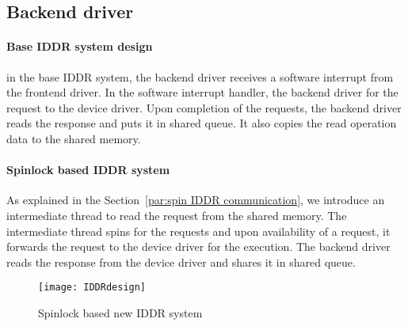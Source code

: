 \subsection{Backend driver}
\paragraph{Base IDDR system design}
in the base IDDR system, the backend driver receives a software interrupt from the frontend driver. In the software interrupt handler, the backend driver for the request to the device driver. Upon completion of the requests, the backend driver reads the response and puts it in shared queue. It also copies the read operation data to the shared memory. 

\paragraph{Spinlock based IDDR system}
As explained in the Section~\ref{par:spin IDDR communication}, we introduce an intermediate thread to read the request from the shared memory. The intermediate thread spins for the requests and upon availability of a request, it forwards the request to the device driver for the execution. The backend driver reads the response from the device driver and shares it in shared queue.
\begin{figure}[!ht]
\centering
\texttt{[image: IDDRdesign]}
\caption{Spinlock based new IDDR system}
\label{fig:new IDDR system}
\end{figure}

    
